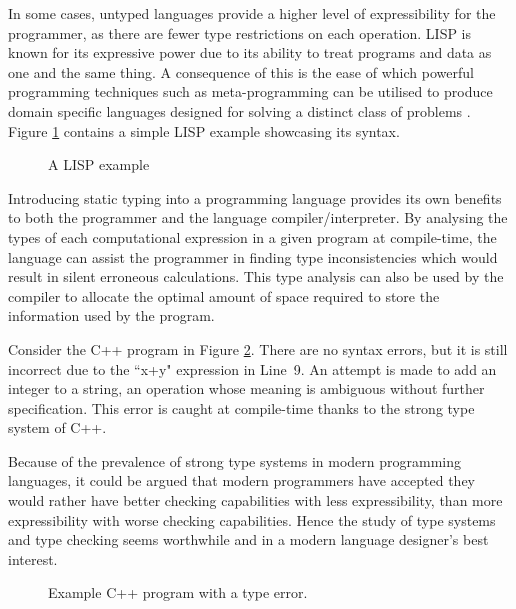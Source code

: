 \documentclass{UoYCSproject}
\begin{document}
In some cases, untyped languages provide a higher level of expressibility for
the programmer, as there are fewer type restrictions on each operation.
LISP is known for its expressive power due to its ability to treat programs and
data as one and the same thing. A consequence of this is the ease of which
powerful programming techniques such as meta-programming can be utilised to
produce domain specific languages designed for solving a distinct class of
problems \cite[\S1, p.~5]{SICP}. Figure \ref{fig:SimpleTypedLanguages} contains a
simple LISP example showcasing its syntax.

\begin{figure}
    
    \caption{A LISP example}
    \label{fig:SimpleTypedLanguages}
\end{figure}

Introducing static typing into a programming language provides its own benefits
to both the programmer and the language compiler/interpreter. By analysing the
types of each computational expression in a given program at compile-time,
the language can assist the programmer in finding type
inconsistencies which would result in silent erroneous calculations. This type
analysis can also be used by the compiler to allocate the optimal amount of
space required to store the information used by the program.

Consider the C++ program in Figure \ref{fig:C++TypeError}.
There are no syntax errors, but it is still incorrect due to the
``x+y" expression in Line~9. An attempt is made to add an integer to a string,
an operation whose meaning is ambiguous without further specification. This
error is caught at compile-time thanks to the strong type system of C++.

Because of the prevalence of strong type systems in modern programming
languages, it could be argued that modern programmers have accepted they would
rather have better checking capabilities with less expressibility, than more
expressibility with worse checking capabilities. Hence the study of type systems
and type checking seems worthwhile and in a modern language designer's best
interest.

\begin{figure}


\caption{Example C++ program with a type error.}
\label{fig:C++TypeError}
\end{figure}
\end{document}
